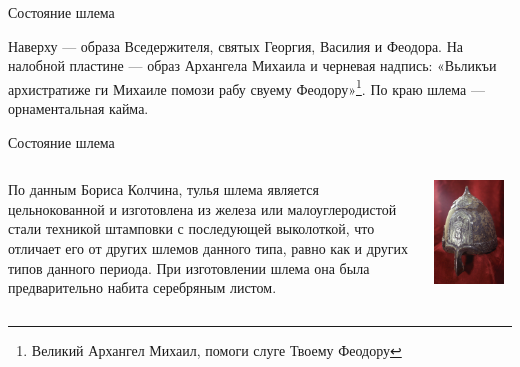 \begin{frame}{Состояние шлема}

	Наверху — образа Вседержителя, святых Георгия, Василия и Феодора. На налобной пластине — образ Архангела Михаила и черневая надпись: «Вьликъи архистратиже ги Михаиле помози рабу свуему Феодору»\footnote{Великий Архангел Михаил, помоги слуге Твоему Феодору}. По краю шлема — орнаментальная кайма.

\end{frame}
\begin{frame}{Состояние шлема}
	\begin{columns}
		\begin{column}{0.45\textwidth}

	По данным Бориса Колчина, тулья шлема является цельнокованной и изготовлена из железа или малоуглеродистой стали техникой штамповки с последующей выколоткой, что отличает его от других шлемов данного типа, равно как и других типов данного периода. При изготовлении шлема она была предварительно набита серебряным листом.

		\end{column}
		\begin{column}{0.45\textwidth}

			\includegraphics[width=0.9\textwidth]{images/shlem-2.jpg}

		\end{column}
	\end{columns}
\end{frame}

